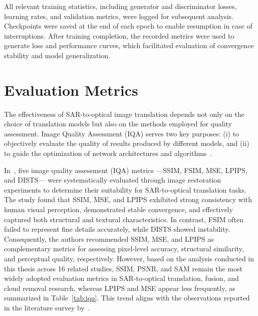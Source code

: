 All relevant training statistics, including generator and discriminator losses, learning rates, and validation metrics, were logged for subsequent analysis. Checkpoints were saved at the end of each epoch to enable resumption in case of interruptions. After training completion, the recorded metrics were used to generate loss and performance curves, which facilitated evaluation of convergence stability and model generalization.


\section{Evaluation Metrics}
The effectiveness of SAR-to-optical image translation depends not only on the choice of translation models but also on the methods employed for quality assessment. Image Quality Assessment (IQA) serves two key purposes: (i) to objectively evaluate the quality of results produced by different models, and (ii) to guide the optimization of network architectures and algorithms~\cite{quality_assessment_S2OT}.

In~\cite{quality_assessment_S2OT}, five image quality assessment (IQA) metrics —SSIM, FSIM, MSE, LPIPS, and DISTS— were systematically evaluated through image restoration experiments to determine their suitability for SAR-to-optical translation tasks. The study found that SSIM, MSE, and LPIPS exhibited strong consistency with human visual perception, demonstrated stable convergence, and effectively captured both structural and textural characteristics. In contrast, FSIM often failed to represent fine details accurately, while DISTS showed instability. Consequently, the authors recommended SSIM, MSE, and LPIPS as complementary metrics for assessing pixel-level accuracy, structural similarity, and perceptual quality, respectively. However, based on the analysis conducted in this thesis across 16 related studies, SSIM, PSNR, and SAM remain the most widely adopted evaluation metrics in SAR-to-optical translation, fusion, and cloud removal research, whereas LPIPS and MSE appear less frequently, as summarized in Table~\ref{tab:iqa}. This trend aligns with the observations reported in the literature survey by~\cite{sar_2_opt_CGAN_survey_taxonomy}.

